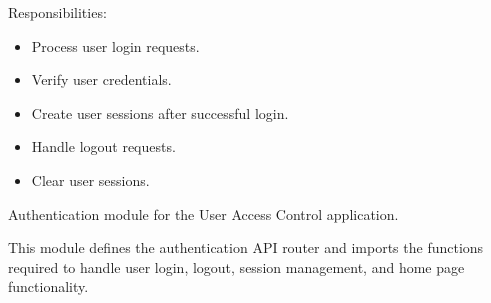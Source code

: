 \documentclass[letterpaper,10pt,english]{sphinxmanual}
\begin{document}
\sphinxAtStartPar
Responsibilities:
\begin{itemize}
\item {} 
\sphinxAtStartPar
Process user login requests.

\item {} 
\sphinxAtStartPar
Verify user credentials.

\item {} 
\sphinxAtStartPar
Create user sessions after successful login.

\item {} 
\sphinxAtStartPar
Handle logout requests.

\item {} 
\sphinxAtStartPar
Clear user sessions.

\end{itemize}

\sphinxAtStartPar
{}

\begin{sphinxVerbatim}[commandchars=\\\{\}]
\end{sphinxVerbatim}

\sphinxAtStartPar
{}
\label{\detokenize{modules:module-app.auth}}
\sphinxAtStartPar
Authentication module for the User Access Control application.

\sphinxAtStartPar
This module defines the authentication API router and imports the
functions required to handle user login, logout, session management,
and home page functionality.
\end{document}

